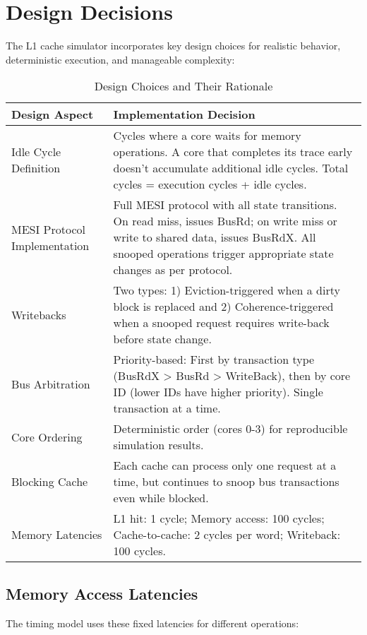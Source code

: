 \documentclass[11pt]{article}
\begin{document}
\section{Design Decisions}
The L1 cache simulator incorporates key design choices for realistic behavior, deterministic execution, and manageable complexity:

\begin{table}[H]
\centering
\caption{Design Choices and Their Rationale}
\begin{tabular}{|p{3cm}|p{12cm}|}
\hline
\textbf{Design Aspect} & \textbf{Implementation Decision} \\
\hline
Idle Cycle Definition & Cycles where a core waits for memory operations. A core that completes its trace early doesn't accumulate additional idle cycles. Total cycles = execution cycles + idle cycles. \\
\hline
MESI Protocol Implementation & Full MESI protocol with all state transitions. On read miss, issues BusRd; on write miss or write to shared data, issues BusRdX. All snooped operations trigger appropriate state changes as per protocol. \\
\hline
Writebacks & Two types: 1) Eviction-triggered when a dirty block is replaced and 2) Coherence-triggered when a snooped request requires write-back before state change. \\
\hline
Bus Arbitration & Priority-based: First by transaction type (BusRdX > BusRd > WriteBack), then by core ID (lower IDs have higher priority). Single transaction at a time. \\
\hline
Core Ordering & Deterministic order (cores 0-3) for reproducible simulation results. \\
\hline
Blocking Cache & Each cache can process only one request at a time, but continues to snoop bus transactions even while blocked. \\
\hline
Memory Latencies & L1 hit: 1 cycle; Memory access: 100 cycles; Cache-to-cache: 2 cycles per word; Writeback: 100 cycles. \\
\hline
\end{tabular}
\end{table}

\subsection{Memory Access Latencies}

The timing model uses these fixed latencies for different operations:
\end{document}
